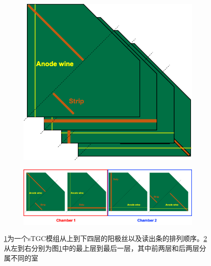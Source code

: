 \begin{figure}[htb]
    \centering
    \begin{subfigure}[b]{0.3\textwidth}
        \centering
        \includegraphics[width=\textwidth,clip]{figures/Chapter3/sTGC_Layers.png}
        \caption{}
        \label{fig:sTGC_Layers}
    \end{subfigure}
    \hfill
    \begin{subfigure}[b]{0.65\textwidth}
        \centering
        \includegraphics[width=\textwidth,clip]{figures/Chapter3/sTGC_chamber.png}
        \caption{}
        \label{fig:sTGC_chamber}
    \end{subfigure}
    \caption[sTGC 模组结构示意图]{\ref{fig:sTGC_Layers}为一个sTGC模组从上到下四层的阳极丝以及读出条的排列顺序。\ref{fig:sTGC_chamber}从左到右分别为图\ref{fig:sTGC_Layers}中的最上层到最后一层，其中前两层和后两层分属不同的室}
       \label{fig:sTGC_All_Layers}
\end{figure}

